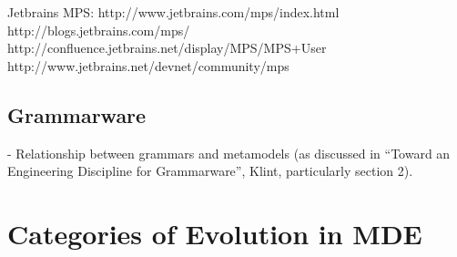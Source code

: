 Jetbrains MPS:
http://www.jetbrains.com/mps/index.html
http://blogs.jetbrains.com/mps/
http://confluence.jetbrains.net/display/MPS/MPS+User%
http://www.jetbrains.net/devnet/community/mps


\subsection{Grammarware}
\label{subsec:grammarware}
- Relationship between grammars and metamodels (as discussed in ``Toward an Engineering Discipline for Grammarware'', Klint, particularly section 2).

\section{Categories of Evolution in MDE}
